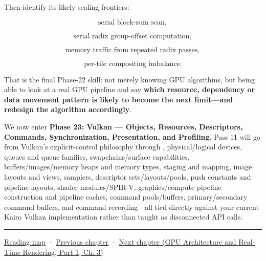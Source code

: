 Then identify its likely scaling frontiers:

\[
\text{serial block-sum scan},
\]

\[
\text{serial radix group-offset computation},
\]

\[
\text{memory traffic from repeated radix passes},
\]

\[
\text{per-tile compositing imbalance}.
\]

That is the final Phase-22 skill: not merely knowing GPU algorithms, but being able to look at a real GPU pipeline and say \textbf{which resource, dependency or data movement pattern is likely to become the next limit---and redesign the algorithm accordingly}.

We now enter \textbf{Phase 23: Vulkan --- Objects, Resources, Descriptors, Commands, Synchronization, Presentation, and Profiling}. Pass 11 will go from Vulkan's explicit-control philosophy through , physical/logical devices, queues and queue families, swapchains/surface capabilities, buffers/images/memory heaps and memory types, staging and mapping, image layouts and views, samplers, descriptor sets/layouts/pools, push constants and pipeline layouts, shader modules/SPIR-V, graphics/compute pipeline construction and pipeline caches, command pools/buffers, primary/secondary command buffers, and command recording---all tied directly against your current Kairo Vulkan implementation rather than taught as disconnected API calls.

\begin{center}\rule{0.5\linewidth}{0.5pt}\end{center}

\hyperref[volume-reading-map]{Reading map} · \hyperref[01-foundations-i-ch011-c-const-borrowing-and-cpugpu-buffering]{Previous chapter} · \href{../06-GPU-Architecture-and-Real-Time-Rendering-P01/main.pdf\#01-foundations-i-ch013-open-vulkan-devices-and-describe-resources}{Next chapter (GPU Architecture and Real-Time Rendering, Part 1, Ch. 3)}
